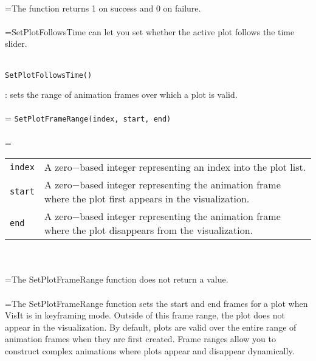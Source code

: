 \documentclass[10pt,a4paper]{report}
\begin{document}
 \\ 
\hangindent=\parindent The function returns 1 on success and 0 on failure. \\[-3mm] 

 \\ 
\hangindent=\parindent SetPlotFollowsTime can let you set whether the active plot follows the time slider. \\[-3mm] 

\\[-6mm]
\begin{verbatim}SetPlotFollowsTime()
\end{verbatim}
\newpage


{}
: sets the range of animation frames over which a plot is valid.\\[-3mm]

 \\ 
\hangindent=\parindent 
\verb!SetPlotFrameRange(index, start, end)!\\ [-3mm]

 \\ 
\hangindent=\parindent 
\begin{tabular}{lp{9cm}}
\verb!index! & A zero$-$based integer representing an index into the plot list. \\
\verb!start! & A zero$-$based integer representing the animation frame where the plot first appears in the visualization. \\
\verb!end! & A zero$-$based integer representing the animation frame where the plot disappears from the visualization. \\
\end{tabular} \\[-2mm]


 \\ 
\hangindent=\parindent The SetPlotFrameRange function does not return a value. \\[-3mm] 

 \\ 
\hangindent=\parindent The SetPlotFrameRange function sets the start and end frames for a plot when VisIt is in keyframing mode. Outside of this frame range, the plot does not appear in the visualization. By default, plots are valid over the entire range of animation frames when they are first created. Frame ranges allow you to construct complex animations where plots appear and disappear dynamically. \\[-3mm] 
\end{document}
